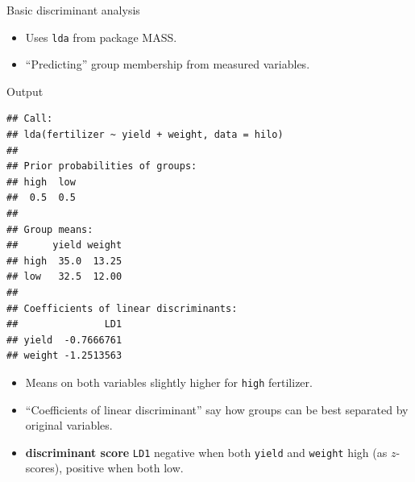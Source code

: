 \begin{frame}[fragile]{Basic discriminant analysis}

\begin{knitrout}
\color{fgcolor}\begin{kframe}
\begin{alltt}
\hlstd{(}
\hlkwb{=}\hlopt{~}\hlopt{+}
\end{alltt}
\end{kframe}
\end{knitrout}

\begin{itemize}
\item Uses \texttt{lda} from package MASS.
\item ``Predicting'' group membership from measured variables.
\end{itemize}

\end{frame}

\begin{frame}[fragile]{Output}

  
  \begin{minipage}[t]{0.6\linewidth}
{\small
\begin{knitrout}
\color{fgcolor}\begin{kframe}
\begin{alltt}
\end{alltt}
\begin{verbatim}
## Call:
## lda(fertilizer ~ yield + weight, data = hilo)
## 
## Prior probabilities of groups:
## high  low 
##  0.5  0.5 
## 
## Group means:
##      yield weight
## high  35.0  13.25
## low   32.5  12.00
## 
## Coefficients of linear discriminants:
##               LD1
## yield  -0.7666761
## weight -1.2513563
\end{verbatim}
\end{kframe}
\end{knitrout}

}
    
  \end{minipage}
  \begin{minipage}[t]{0.37\linewidth}
  \begin{itemize}
  \item Means on both variables slightly higher for \texttt{high}
    fertilizer.
  \item ``Coefficients of linear discriminant'' say how groups can be
    best separated by original variables.
  \item \textbf{discriminant score} \texttt{LD1} negative when both
    \texttt{yield} and \texttt{weight} high (as $z$-scores), positive
    when both low. 
  \end{itemize}
  \end{minipage}

\end{frame}



